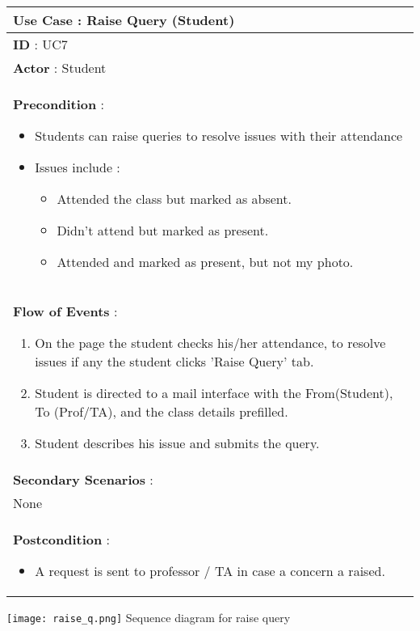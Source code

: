 \documentclass[paper=a4, fontsize=15pt]{scrartcl}
\begin{document}
    
\begin{tabular}{|p{36em}|} 
 \hline
 \textbf{Use Case :  Raise Query (Student)}\\
 \hline
 \textbf{ID } : UC7\\
 \hline
 \textbf{Actor }: Student\\
 \hline
 \textbf{Precondition }:
 \begin{itemize}[topsep=0pt]
     \item Students can raise queries to resolve issues with their attendance
     \item Issues include :
     \begin{itemize}[topsep=0pt]
         \item Attended the class but marked as absent.
         \item Didn't attend but marked as present.
         \item Attended and marked as present, but not my photo.
     \end{itemize}
 \end{itemize}\\
 \hline
 \textbf{Flow of Events }:
 \begin{enumerate}[topsep=0pt]
     \item On the page the student checks his/her attendance, to resolve issues if any the student clicks 'Raise Query' tab.
     \item Student is directed to a mail interface with the From(Student), To (Prof/TA), and the class details prefilled.     
     \item Student describes his issue and submits the query.      
 \end{enumerate}\\
 \hline
 \textbf{Secondary Scenarios }:\\
None\\
 \hline 
 \textbf{Postcondition }:
 \begin{itemize}[topsep=0pt]
     \item A request is sent to professor / TA in case a concern a raised.    
 \end{itemize}\\
 \hline
 
 
 \end{tabular}
 
  \begin{center}
\texttt{[image: raise\_q.png]}
 {\Large Sequence diagram for raise query}
\end{center}
\end{document}
